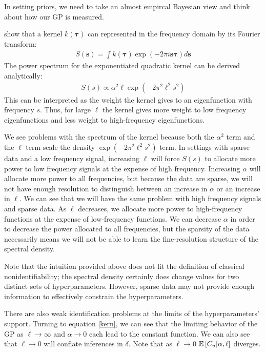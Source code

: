 \documentclass{article}
\newcommand{\Exp}[1]{\ensuremath{\mathbb{E} \lb #1 \rb}}
\newcommand{\lb}{\ensuremath{\left[}}
\newcommand{\rb}{\ensuremath{\right]}}
\begin{document}
In setting priors, we need to take an almost empircal Bayesian view and think
about how our GP is measured. 

\citet{rasmussen2005gaussian} show that a kernel $k(\boldsymbol{\tau})$ can
represented in the frequency domain by its Fourier transform:
\begin{align*}
  S(\mathbf{s}) = \int k(\mathbf{\tau}) \exp \left( -2 \pi i \mathbf{s}  \boldsymbol{\tau} \right) d\mathbf{s}
\end{align*}
The power spectrum for the exponentiated quadratic kernel can be derived analytically:
\begin{align*} 
  S(s) \propto \alpha^2 \ell
   \exp \left(
  - 2 \pi^2 \ell^2 s^2
\right)
\end{align*} 
This can be interpreted as the weight the kernel gives to an eigenfunction with
frequency $s$. Thus, for large $\ell$ the kernel gives more weight to low
frequency eigenfunctions and less weight to high-frequency eigenfunctions. 

We see problems with the spectrum of the kernel because both the $\alpha ^ 2$
term and the $\ell$ term scale the density $\exp \left(- 2 \pi^2 \ell^2 s^2
\right)$ term. In settings with sparse data and a low frequency signal,
increasing $\ell$ will force $S(s)$ to allocate more power to low frequency
signals at the expense of high frequency. Increasing $\alpha$ will allocate
more power to all frequencies, but because the data are sparse, we will not
have enough resolution to distinguish between an increase in $\alpha$ or an
increase in $\ell$. We can see that we will have the same problem with high
frequency signals and sparse data. As $\ell$ decreases, we allocate more power
to high-frequency functions at the expense of low-frequency functions. We can
decrease $\alpha$ in order to decrease the power allocated to all frequencies,
but the sparsity of the data necessarily means we will not be able to learn the
fine-resolution structure of the spectral density.

Note that the intuition provided above does not fit the definition of 
classical nonidentifiability; the spectral density certainly does change
values for two distinct sets of hyperparameters. However, sparse data
may not provide enough information to effectively constrain the hyperparameters.

There are also weak identification problems at the limits of the
hyperparameters' support. Turning to equation \ref{kern}, we can see that
the limiting behavior of the GP as $\ell \rightarrow \infty$ and $\alpha
\rightarrow 0$ each lead to the constant function. We can also see that $\ell
\rightarrow 0$ will conflate inferences in $\delta$.  Note that as $\ell
\rightarrow 0$ $\Exp{C_u | \alpha, \ell}$ diverges.
\end{document}
